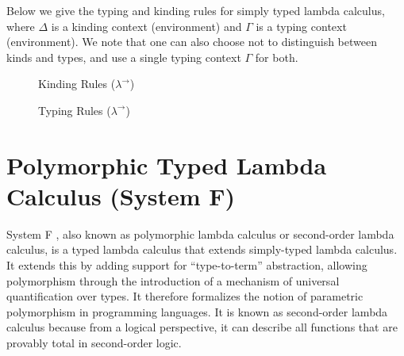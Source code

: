 \documentclass[acmsmall, 9pt]{article}
\begin{document}
\lbreak
Below we give the typing and kinding rules for simply typed lambda calculus, where $\Delta$ is a kinding context (environment) and $\Gamma$ is a typing context (environment). We note that one can also choose not to distinguish between kinds and types, and use a single typing context $\Gamma$ for both.
\begin{figure}[H]
\flushleft {}
\caption{Kinding Rules ($\lambda^{\rightarrow}$)}
\end{figure}

\begin{figure}[H]
\flushleft {}
\caption{Typing Rules ($\lambda^{\rightarrow}$)}
\end{figure}

\section{Polymorphic Typed Lambda Calculus (System F)}
System F \cite{lambda-calc, cambridge-lambda-calc}, also known as polymorphic lambda calculus or second-order lambda calculus, is a typed lambda calculus that extends simply-typed lambda calculus. It extends this by adding support for ``type-to-term'' abstraction, allowing polymorphism through the introduction of a mechanism of universal quantification over types. It therefore formalizes the notion of parametric polymorphism in programming languages. It is known as second-order lambda calculus because from a logical perspective, it can describe all functions that are provably total in second-order logic.
\end{document}
